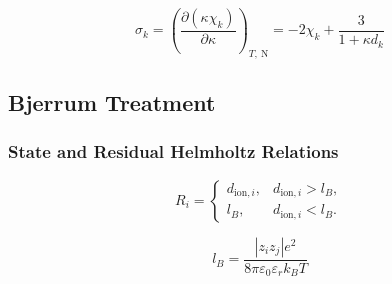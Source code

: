 \documentclass[12pt, letterpaper]{article}
\begin{document}

\begin{equation}
    \sigma_{k}=\left(\frac{\partial\left(\kappa \chi_{k}\right)}{\partial \kappa}\right)_{T, \mathrm{~N}}=-2 \chi_{k}+\frac{3}{1+\kappa d_{k}}
    \label{eq:sigma_dh_2005}
\end{equation}

\subsection{Bjerrum Treatment}
\label{sec:supp_bjerrum}
\label{sec:supp_bjerrum}

\subsubsection{State and Residual Helmholtz Relations}


\begin{equation}
    R_{i}=
    \begin{cases}
        d_{\mathrm{ion},i}, & d_{\mathrm{ion},i}>l_{B}, \\
        l_{B},              & d_{\mathrm{ion},i}<l_{B}.
    \end{cases}
    \label{eq:r_ion_bjerrum}
\end{equation}


\begin{equation}
    l_{B}=\frac{\left|z_{i}z_{j}\right|e^2}{8\pi\varepsilon_{0}\varepsilon_{r}k_{B}T}
    \label{eq:bjerrum_length}
\end{equation}
\end{document}
